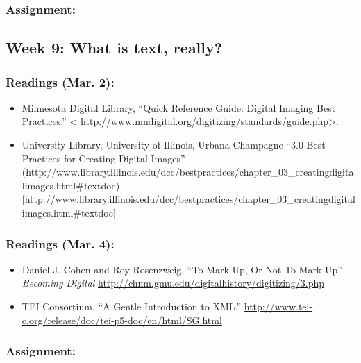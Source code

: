 \documentclass[]{article}
\begin{document}
\subsubsection{Assignment:}\label{assignment-1}

\subsection{Week 9: What is text,
really?}\label{week-9-what-is-text-really}

\subsubsection{Readings (Mar. 2):}\label{readings-mar.-2}

\begin{itemize}
\itemsep1pt\parskip0pt
\item
  Minnesota Digital Library, ``Quick Reference Guide: Digital Imaging
  Best Practices.'' \textless{}
  \url{http://www.mndigital.org/digitizing/standards/guide.php}\textgreater{}.
\item
  University Library, University of Illinois, Urbana-Champagne ``3.0
  Best Practices for Creating Digital Images''
  (http://www.library.illinois.edu/dcc/bestpractices/chapter\_03\_creatingdigitalimages.html\#textdoc){[}http://www.library.illinois.edu/dcc/bestpractices/chapter\_03\_creatingdigitalimages.html\#textdoc{]}
\end{itemize}

\subsubsection{Readings (Mar. 4):}\label{readings-mar.-4}

\begin{itemize}
\itemsep1pt\parskip0pt
\item
  Daniel J. Cohen and Roy Rosenzweig, ``To Mark Up, Or Not To Mark Up''
  \emph{Becoming Digital}
  \url{http://chnm.gmu.edu/digitalhistory/digitizing/3.php}
\item
  TEI Consortium. ``A Gentle Introduction to XML.''
  \url{http://www.tei-c.org/release/doc/tei-p5-doc/en/html/SG.html}
\end{itemize}

\subsubsection{Assignment:}\label{assignment-2}
\end{document}
